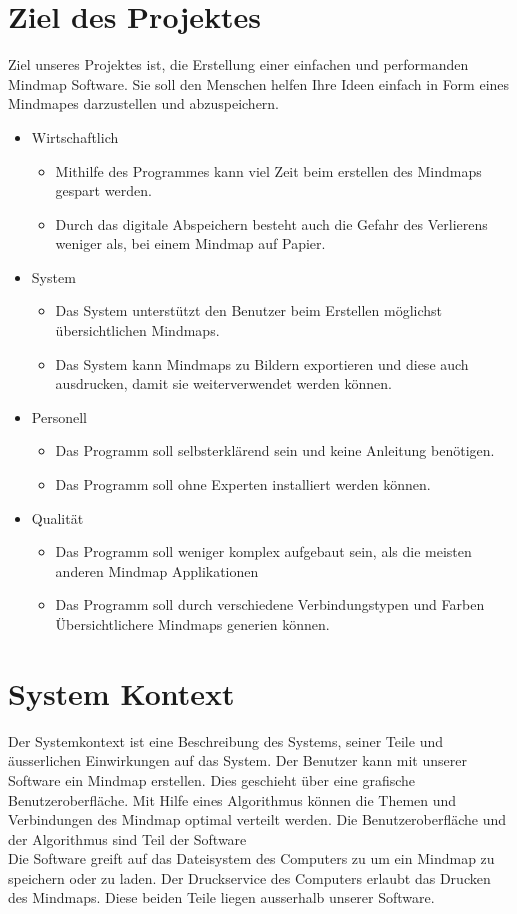 \documentclass[a4paper,parskip]{scrartcl}
\begin{document}
\section{Ziel des Projektes}
Ziel unseres Projektes ist, die Erstellung einer einfachen und performanden Mindmap Software. Sie soll
den Menschen helfen Ihre Ideen einfach in Form eines Mindmapes darzustellen und abzuspeichern.\\
\begin{itemize}
\item Wirtschaftlich
	\begin{itemize}
	\item Mithilfe des Programmes kann viel Zeit beim erstellen des Mindmaps gespart werden.
	\item Durch das digitale Abspeichern besteht auch die Gefahr des Verlierens weniger als, bei einem Mindmap auf Papier.
	\end{itemize}
\item System
	\begin{itemize}
	\item Das System unterstützt den Benutzer beim Erstellen möglichst übersichtlichen Mindmaps.
	\item Das System kann Mindmaps zu Bildern exportieren und diese auch ausdrucken, damit sie weiterverwendet werden können.
	\end{itemize}
\item Personell
	\begin{itemize}
	\item Das Programm soll selbsterklärend sein und keine Anleitung benötigen.
	\item Das Programm soll ohne Experten installiert werden können.
	\end{itemize}
\item Qualität
	\begin{itemize}
	\item Das Programm soll weniger komplex aufgebaut sein, als die meisten anderen Mindmap Applikationen
	\item Das Programm soll durch verschiedene Verbindungstypen und Farben Übersichtlichere Mindmaps generien können.
	\end{itemize}

\end{itemize}
\newpage


\section{System Kontext}
Der Systemkontext ist eine Beschreibung des Systems, seiner Teile und äusserlichen Einwirkungen auf das System.
Der Benutzer kann mit unserer Software ein Mindmap erstellen. Dies geschieht über eine grafische Benutzeroberfläche. Mit Hilfe eines Algorithmus können die Themen und Verbindungen des Mindmap optimal verteilt werden. Die Benutzeroberfläche und der Algorithmus sind Teil der Software\\
Die Software greift auf das Dateisystem des Computers zu um ein Mindmap zu speichern oder zu laden.
Der Druckservice des Computers erlaubt das Drucken des Mindmaps. Diese beiden Teile liegen ausserhalb unserer Software.
\end{document}
